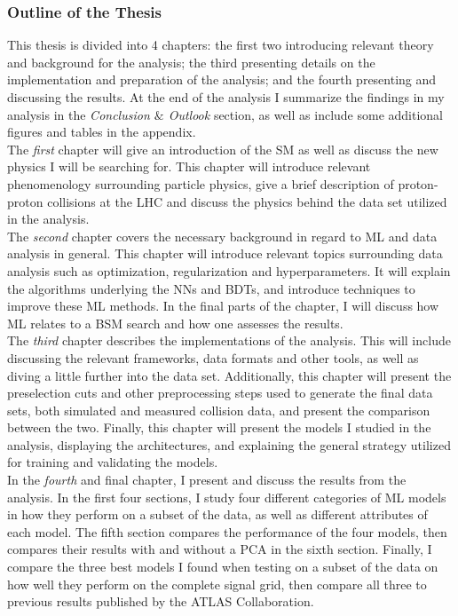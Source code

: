 \subsubsection*{Outline of the Thesis}
This thesis is divided into 4 chapters: the first two introducing relevant theory and background for the analysis; the third presenting
details on the implementation and preparation of the analysis; and the fourth presenting and discussing the results. At the end of the analysis I 
summarize the findings in my analysis in the \emph{Conclusion $\&$ Outlook} section, as well as include some additional figures and tables 
in the appendix. 
\\\newline
The \emph{first} chapter will give an introduction of the \ac{SM} as well as discuss the new physics I will be searching for. This chapter will 
introduce relevant phenomenology surrounding particle physics, give a brief description of proton-proton collisions at the \ac{LHC} and discuss 
the physics behind the data set utilized in the analysis. 
\\\newline
The \emph{second} chapter covers the necessary background in regard to \ac{ML} and data analysis in general. This chapter will introduce relevant topics
surrounding data analysis such as optimization, regularization and hyperparameters. It will explain the algorithms underlying the \ac{NN}s and 
\ac{BDT}s, and introduce techniques to improve these \ac{ML} methods. In the final parts of the chapter, I will discuss how \ac{ML} relates to 
a \acf{BSM} search and how one assesses the results.
\\\newline
The \emph{third} chapter describes the implementations of the analysis. This will include discussing the relevant frameworks, data formats and 
other tools, as well as diving a little further into the data set. Additionally, this chapter will present the preselection cuts and other preprocessing steps
used to generate the final data sets, both simulated and measured collision data, and present the comparison between the two. Finally, this chapter will present the 
models I studied in the analysis, displaying the architectures, and explaining the general strategy utilized for training and validating the models.
\\\newline
In the \emph{fourth} and final chapter, I present and discuss the results from the analysis. In the first four sections, I study four different categories of \ac{ML} models 
in how they perform on a subset of the data, as well as different attributes of each model. The fifth section compares the performance of the four models, then compares 
their results with and without a \acf{PCA} in the sixth section. Finally, I compare the three best models I found when testing on a subset of the data on how well they perform 
on the complete signal grid, then compare all three to previous results published by the \acs{ATLAS} Collaboration.




